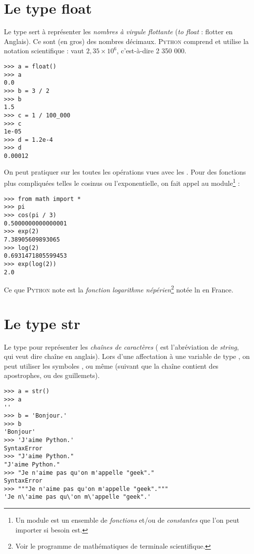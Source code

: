 \section{Le type float}
Le type  sert à représenter les \textit{nombres à virgule flottante} (\textit{to float} : flotter en Anglais). Ce sont (en gros) des nombres
décimaux. \textsc{Python} comprend et utilise la notation scientifique :  vaut $2,35\times 10^6$, c'est-à-dire 2 350 000.

\begin{pys}\begin{verbatim}
>>> a = float()
>>> a
0.0
>>> b = 3 / 2
>>> b
1.5
>>> c = 1 / 100_000
>>> c
1e-05
>>> d = 1.2e-4
>>> d
0.00012
\end{verbatim}
\end{pys}

On peut pratiquer sur les  toutes les opérations vues avec les . Pour des fonctions plus compliquées telles le cosinus ou
l'exponentielle, on fait appel au module\footnote{Un module est un ensemble de \textit{fonctions} et/ou de \textit{constantes} que l'on peut importer si besoin est.}
 :

\begin{pys}\begin{verbatim}
>>> from math import *
>>> pi
>>> cos(pi / 3)
0.5000000000000001
>>> exp(2)
7.38905609893065
>>> log(2)
0.6931471805599453
>>> exp(log(2))
2.0
\end{verbatim}
\end{pys}

Ce que \textsc{Python} note  est la \textit{fonction logarithme népérien}\footnote{Voir le programme de mathématiques
    de terminale scientifique.} notée ln en France.
\section{Le type str}

Le type  pour représenter les \textit{chaînes de caractères} ( est l'abréviation de \emph{string}, qui veut dire chaîne en anglais).
Lors d'une affectation à une variable de type , on peut utiliser les symboles ,  ou même  (suivant que la chaîne contient
des apostrophes, ou des guillemets).

\begin{pys}\begin{verbatim}
>>> a = str()
>>> a
''
>>> b = 'Bonjour.'
>>> b
'Bonjour'
>>> 'J'aime Python.'
SyntaxError
>>> "J'aime Python."
"J'aime Python."
>>> "Je n'aime pas qu'on m'appelle "geek"."
SyntaxError
>>> """Je n'aime pas qu'on m'appelle "geek"."""
'Je n\'aime pas qu\'on m\'appelle "geek".'
\end{verbatim}
\end{pys}

